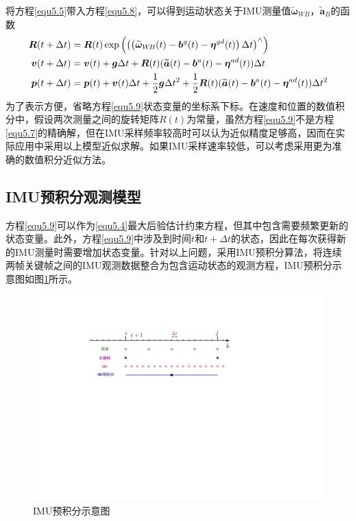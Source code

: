 将方程\eqref{equ5.5}带入方程\eqref{equ5.8}，可以得到运动状态关于IMU测量值$\widetilde{\boldsymbol{\omega}}_{W\!B}$，$\widetilde{\boldsymbol{a}}_B$的函数
\begin{equation}
\label{equ5.9}
\begin{aligned}
\boldsymbol{R}(t+\Delta t) &= \boldsymbol{R}(t)\exp \left( \left(  \left( \widetilde{\boldsymbol{\omega}}_{W\!B}(t)-\boldsymbol{b}^g(t)-\boldsymbol{\eta}^{gd}(t) \right) \Delta t \right)^{\wedge}  \right) \\ 
\boldsymbol{v}(t+\Delta t) &= \boldsymbol{v}(t)+\boldsymbol{g} \Delta t + \boldsymbol{R}(t)(\widetilde{\boldsymbol{a}}(t)-\boldsymbol{b}^a(t)-\boldsymbol{\eta}^{ad}(t))\Delta t \\
\boldsymbol{p}(t+\Delta t) &= \boldsymbol{p}(t)+\boldsymbol{v}(t)\Delta t + {1 \over 2}\boldsymbol{g}\Delta t^2 + {1 \over 2}\boldsymbol{R}(t)(\widetilde{\boldsymbol{a}}(t)-\boldsymbol{b}^a(t)-\boldsymbol{\eta}^{ad}(t))\Delta t^2
\end{aligned}
\end{equation}
为了表示方便，省略方程\eqref{equ5.9}状态变量的坐标系下标。在速度和位置的数值积分中，假设两次测量之间的旋转矩阵$R(t)$为常量，虽然方程\eqref{equ5.9}不是方程\eqref{equ5.7}的精确解，但在IMU采样频率较高时可以认为近似精度足够高，因而在实际应用中采用以上模型近似求解。如果IMU采样速率较低，可以考虑采用更为准确的数值积分近似方法。

\subsection{IMU预积分观测模型}
方程\eqref{equ5.9}可以作为\eqref{equ5.4}最大后验估计约束方程，但其中包含需要频繁更新的状态变量。此外，方程\eqref{equ5.9}中涉及到时间$t$和$t+\Delta t$的状态，因此在每次获得新的IMU测量时需要增加状态变量。针对以上问题，采用IMU预积分算法，将连续两帧关键帧之间的IMU观测数据整合为包含运动状态的观测方程，IMU预积分示意图如图\ref{fig5.2}所示。

\begin{figure}[h]
\centering
\includegraphics[scale=0.6,angle=-90]{figures/Fig5-2.pdf}
\caption{IMU预积分示意图}
\label{fig5.2}
\end{figure}

